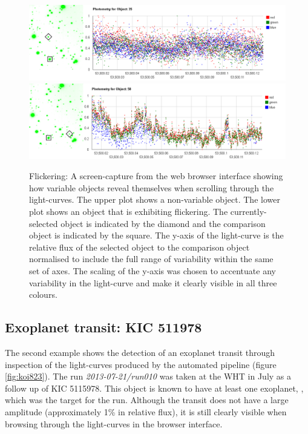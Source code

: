 \begin{figure}
\centering
\includegraphics[width=150mm]{images/gumus-comparison-lc.png}
\includegraphics[width=150mm]{images/gumus-discovery-lc.png}
\caption{Flickering: A screen-capture from the web browser interface showing how variable objects reveal themselves when scrolling through the light-curves. The upper plot shows a non-variable object. The lower plot shows an object that is exhibiting flickering.  The currently-selected object is indicated by the diamond and the comparison object is indicated by the square. The y-axis of the light-curve is the relative flux of the selected object to the comparison object normalised to include the full range of variability within the same set of axes. The scaling of the y-axis was chosen to accentuate any variability in the light-curve and make it clearly visible in all three colours.}
\label{fig:gumus-discovery}
\end{figure}

\subsection{Exoplanet transit: KIC 511978}
The second example shows the detection of an exoplanet transit through inspection of the light-curves produced by the automated pipeline (figure \ref{fig:koi823}). The run \emph{2013-07-21/run010} was taken at the WHT in July as a follow up of KIC 5115978. This object is known to have at least one exoplanet, \citep{KIC5115978}, which was the target for the run. Although the transit does not have a large amplitude (approximately 1\% in relative flux), it is still clearly visible when browsing through the light-curves in the browser interface. 

